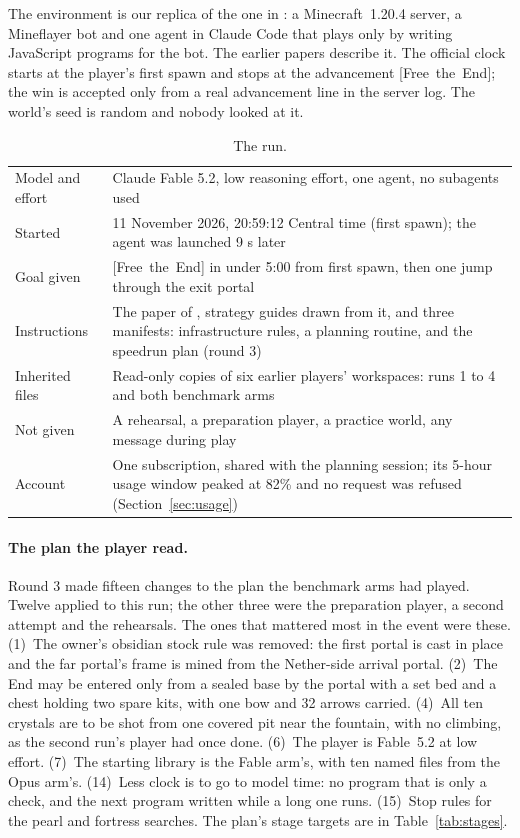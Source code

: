 \documentclass[11pt,a4paper]{article}
\newcommand{\adv}[1]{\mbox{\textsf{[#1]}}}
\begin{document}
The environment is our replica of the one in \citet{faldor2026team}: a Minecraft~1.20.4 server, a Mineflayer bot \citep{mineflayer} and one agent in Claude Code \citep{claudecode} that plays only by writing JavaScript programs for the bot. The earlier papers describe it. The official clock starts at the player's first spawn and stops at the advancement \adv{Free the End}; the win is accepted only from a real advancement line in the server log. The world's seed is random and nobody looked at it.

\begin{table}[H]
\caption{The run.}
\label{tab:run}
\begin{tabularx}{\textwidth}{@{}lX@{}}
\toprule
Model and effort & Claude Fable 5.2, low reasoning effort, one agent, no subagents used \\
Started & 11 November 2026, 20:59:12 Central time (first spawn); the agent was launched 9 s later \\
Goal given & \adv{Free the End} in under 5:00 from first spawn, then one jump through the exit portal \\
Instructions & The paper of \citet{faldor2026team}, strategy guides drawn from it, and three manifests: infrastructure rules, a planning routine, and the speedrun plan (round 3) \\
Inherited files & Read-only copies of six earlier players' workspaces: runs 1 to 4 and both benchmark arms \\
Not given & A rehearsal, a preparation player, a practice world, any message during play \\
Account & One subscription, shared with the planning session; its 5-hour usage window peaked at 82\% and no request was refused (Section~\ref{sec:usage}) \\
\bottomrule
\end{tabularx}
\end{table}

\paragraph{The plan the player read.} Round 3 made fifteen changes to the plan the benchmark arms had played. Twelve applied to this run; the other three were the preparation player, a second attempt and the rehearsals. The ones that mattered most in the event were these. (1)~The owner's obsidian stock rule was removed: the first portal is cast in place and the far portal's frame is mined from the Nether-side arrival portal. (2)~The End may be entered only from a sealed base by the portal with a set bed and a chest holding two spare kits, with one bow and 32 arrows carried. (4)~All ten crystals are to be shot from one covered pit near the fountain, with no climbing, as the second run's player had once done. (6)~The player is Fable~5.2 at low effort. (7)~The starting library is the Fable arm's, with ten named files from the Opus arm's. (14)~Less clock is to go to model time: no program that is only a check, and the next program written while a long one runs. (15)~Stop rules for the pearl and fortress searches. The plan's stage targets are in Table~\ref{tab:stages}.
\end{document}
